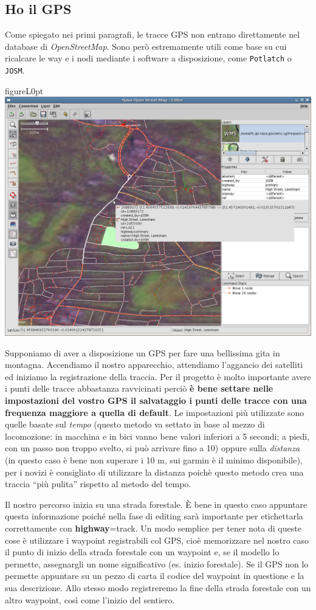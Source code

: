 \documentclass[a4paper,twoside,12pt,]{article}
\newcommand{\osm}{\emph{OpenStreetMap}\xspace}
\newcommand{\gps}{GPS\xspace}
\newcommand{\key}[1]{\textsf{\textbf{#1}}}
\newcommand{\val}[1]{\textsf{#1}}
\newcommand{\soft}[1]{\texttt{#1}}
\begin{document}
\subsection{Ho il \gps}
Come spiegato nei primi paragrafi, le tracce \gps non entrano direttamente nel database di \osm. Sono però estremamente utili come base su cui ricalcare le way e i nodi mediante i software a disposizione, come \soft{Potlatch} o \soft{JOSM}.
\begin{wrapfloat}{figure}{L}{0pt}
 \includegraphics[width=0.6\columnwidth]{Josm-screenshot.png}
 \caption{\textit{L'interfaccia di JOSM}}
\end{wrapfloat}
Supponiamo di aver a disposizione un \gps per fare una bellissima gita in montagna. Accendiamo il nostro apparecchio, attendiamo l'aggancio dei satelliti ed iniziamo la registrazione della traccia. Per il progetto è molto importante avere i punti delle tracce abbastanza ravvicinati perciò \textbf{è bene settare nelle impostazioni del vostro \gps il salvataggio i punti delle tracce con una frequenza maggiore a quella di default}. Le impostazioni più utilizzate sono quelle basate sul \textit{tempo} (questo metodo va settato in base al mezzo di locomozione: in macchina e in bici vanno bene valori inferiori a 5 secondi; a piedi, con un passo non troppo svelto, si può arrivare fino a 10) oppure sulla \textit{distanza} (in questo caso è bene non superare i 10 m, sui garmin è il minimo disponibile), per i novizi è consigliato di utilizzare la distanza poichè questo metodo crea una traccia ``più pulita'' rispetto al metodo del tempo.

Il nostro percorso inizia su una strada forestale. È bene in questo caso appuntare questa informazione poiché nella fase di editing sarà importante per etichettarla correttamente con \key{highway}=\val{track}. Un modo semplice per tener nota di queste cose è utilizzare i waypoint registrabili col \gps, cioè memorizzare nel nostro caso il punto di inizio della strada forestale con un waypoint e, se il modello lo permette, assegnargli un nome significativo (es. inizio forestale). Se il \gps non lo permette appuntare su un pezzo di carta il codice del waypoint in questione e la sua descrizione. Allo stesso modo registreremo la fine della strada forestale con un altro waypoint, così come l'inizio del sentiero.
\end{document}
